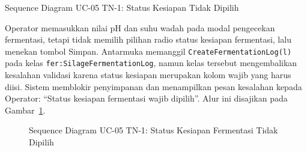 \newpage

\item{Sequence Diagram UC-05 TN-1: Status Kesiapan Tidak Dipilih}

Operator memasukkan nilai pH dan suhu wadah pada modal pengecekan
fermentasi, tetapi tidak memilih pilihan radio status kesiapan fermentasi,
lalu menekan tombol Simpan. Antarmuka memanggil
\texttt{CreateFermentationLog(l)} pada kelas
\texttt{fer:SilageFermentationLog}, namun kelas tersebut mengembalikan
kesalahan validasi karena status kesiapan merupakan kolom wajib yang
harus diisi. Sistem memblokir penyimpanan dan menampilkan pesan kesalahan
kepada Operator: ``Status kesiapan fermentasi wajib dipilih''. Alur ini
disajikan pada Gambar~\ref{fig:seq_uc05_tn1_validasi}.

\begin{figure}[htbp]
\centering
{}
\caption{Sequence Diagram UC-05 TN-1: Status Kesiapan Fermentasi Tidak Dipilih}
\label{fig:seq_uc05_tn1_validasi}
\end{figure}


